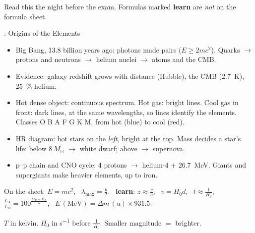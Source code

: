 
Read this the night before the exam. Formulas marked
\textcolor{hscmistake}{\bfseries learn} are \emph{not} on the formula sheet.

\setlength\lineskiplimit{1.5pt}\setlength\lineskip{2.5pt}
\newcommand\sumLearn{\textcolor{hscmistake}{\bfseries learn}}
\newcommand\sumhead[1]{\par\smallskip\noindent{\bfseries\color{hscbrand}#1}\enspace}
\newenvironment{sumlist}{\begin{itemize}[itemsep=0pt, topsep=2pt]}{\end{itemize}}

\begin{summarybox}[fontupper=\small]{: Origins of the Elements}
\begin{sumlist}
  \item Big Bang, 13.8 billion years ago: photons made pairs ($E \ge 2mc^2$). Quarks $\to$
        protons and neutrons $\to$ helium nuclei $\to$ atoms and the CMB.
  \item Evidence: galaxy redshift grows with distance (Hubble), the CMB (\qty{2.7}{K}),
        \qty{25}{\percent} helium.
  \item Hot dense object: continuous spectrum. Hot gas: bright lines. Cool gas in front:
        dark lines, at the same wavelengths, so lines identify the elements. Classes
        O B A F G K M, from hot (blue) to cool (red).
  \item HR diagram: hot stars on the \emph{left}, bright at the top. Mass decides a
        star's life: below $8\,M_\odot$ $\to$ white dwarf; above $\to$ supernova.
  \item p--p chain and CNO cycle: 4 protons $\to$ helium-4 $+$ \qty{26.7}{MeV}. Giants
        and supergiants make heavier elements, up to iron.
\end{sumlist}
\sumhead{Formulas} On the sheet: $E = mc^2$, \ $\lambda_\mathrm{max} = \frac{b}{T}$.
\ \sumLearn: $z \approx \frac{v}{c}$, \ $v = H_0 d$, \ $t \approx \frac{1}{H_0}$, \
$\frac{L_A}{L_B} = 100^{\frac{M_B - M_A}{5}}$, \ $E\,(\mathrm{MeV}) = \Delta m\,(\mathrm{u})
\times 931.5$.
\sumhead{Traps} $T$ in kelvin. $H_0$ in \si{s^{-1}} before $\frac{1}{H_0}$. Smaller
magnitude $=$ brighter.
\end{summarybox}

